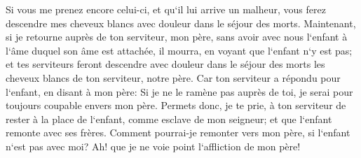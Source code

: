 \verse Si vous me prenez encore celui-ci, et qu`il lui arrive un malheur, vous ferez descendre mes cheveux blancs avec douleur dans le séjour des morts. 
\verse Maintenant, si je retourne auprès de ton serviteur, mon père, sans avoir avec nous l`enfant à l`âme duquel son âme est attachée, 
\verse il mourra, en voyant que l`enfant n`y est pas; et tes serviteurs feront descendre avec douleur dans le séjour des morts les cheveux blancs de ton serviteur, notre père. 
\verse Car ton serviteur a répondu pour l`enfant, en disant à mon père: Si je ne le ramène pas auprès de toi, je serai pour toujours coupable envers mon père. 
\verse Permets donc, je te prie, à ton serviteur de rester à la place de l`enfant, comme esclave de mon seigneur; et que l`enfant remonte avec ses frères. 
\verse Comment pourrai-je remonter vers mon père, si l`enfant n`est pas avec moi? Ah! que je ne voie point l`affliction de mon père! 

